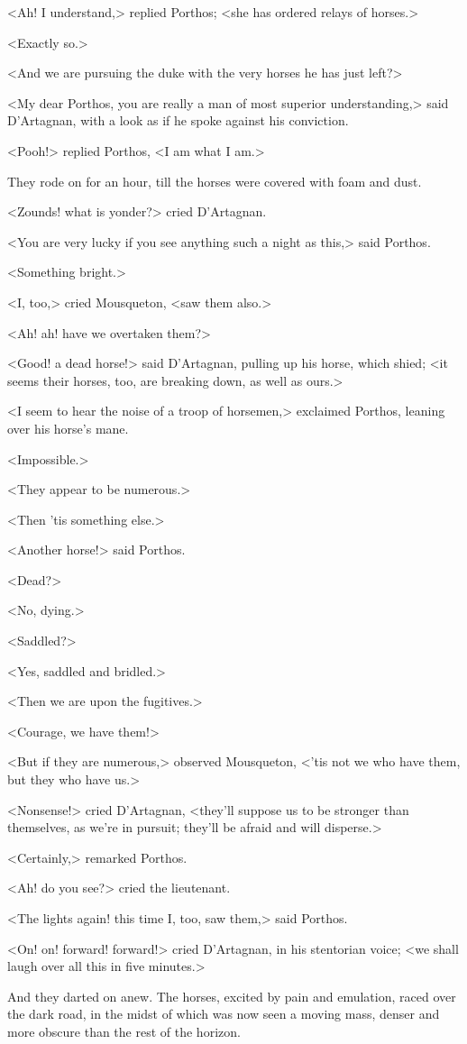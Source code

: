 <Ah! I understand,> replied Porthos; <she has ordered relays of horses.>

<Exactly so.>

<And we are pursuing the duke with the very horses he has just left?>

<My dear Porthos, you are really a man of most superior understanding,> said D'Artagnan, with a look as if he spoke against his conviction.

<Pooh!> replied Porthos, <I am what I am.>

They rode on for an hour, till the horses were covered with foam and dust.

<Zounds! what is yonder?> cried D'Artagnan.

<You are very lucky if you see anything such a night as this,> said Porthos.

<Something bright.>

<I, too,> cried Mousqueton, <saw them also.>

<Ah! ah! have we overtaken them?>

<Good! a dead horse!> said D'Artagnan, pulling up his horse, which shied; <it seems their horses, too, are breaking down, as well as ours.>

<I seem to hear the noise of a troop of horsemen,> exclaimed Porthos, leaning over his horse's mane.

<Impossible.>

<They appear to be numerous.>

<Then 'tis something else.>

<Another horse!> said Porthos.

<Dead?>

<No, dying.>

<Saddled?>

<Yes, saddled and bridled.>

<Then we are upon the fugitives.>

<Courage, we have them!>

<But if they are numerous,> observed Mousqueton, <'tis not we who have them, but they who have us.>

<Nonsense!> cried D'Artagnan, <they'll suppose us to be stronger than themselves, as we're in pursuit; they'll be afraid and will disperse.>

<Certainly,> remarked Porthos.

<Ah! do you see?> cried the lieutenant.

<The lights again! this time I, too, saw them,> said Porthos.

<On! on! forward! forward!> cried D'Artagnan, in his stentorian voice; <we shall laugh over all this in five minutes.>

And they darted on anew. The horses, excited by pain and emulation, raced over the dark road, in the midst of which was now seen a moving mass, denser and more obscure than the rest of the horizon. 